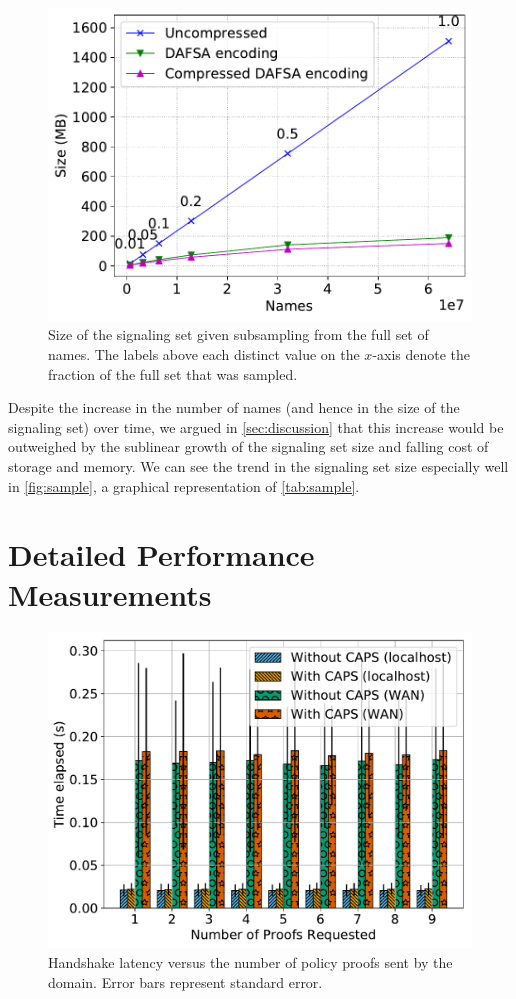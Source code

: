 \begin{figure}[t]
  \centering
  \includegraphics[width=0.95\linewidth]{fig/sample}
  \caption{Size of the signaling set given subsampling from the full set of
  names. The labels above each distinct value on the $x$-axis denote the
fraction of the full set that was sampled.}
  \label{fig:sample}
\end{figure}

Despite the increase in the number of names (and hence in the size of the
signaling set) over time, we argued in \autoref{sec:discussion} that this
increase would be outweighed by the sublinear growth of the signaling set size
and falling cost of storage and memory. We can see the trend in the signaling
set size especially well in \autoref{fig:sample}, a graphical representation of
\autoref{tab:sample}.

\section{Detailed Performance Measurements}
\label{sec:overhead}

\begin{figure}[t]
  \centering
  \includegraphics[width=0.8\linewidth]{fig/eval_tls_ext/0-time_elapsed_vs_num_proofs_requested}
  \caption{Handshake latency versus the number of policy proofs sent by the
  domain. Error bars represent standard error.}
  \label{fig:numproofs}
\end{figure}

